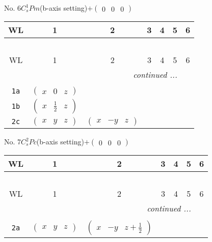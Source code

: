 \documentclass[fleqn,9pt,landscape]{jsarticle}
\begin{document}
\newpage
No. 6\quad$C_{s}^{1}$\quad$Pm$\quad(b-axis setting)\quad[ monoclinic ]\quad$+\begin{pmatrix} 0 & 0 & 0 \end{pmatrix}$
\begin{center}
\renewcommand{\arraystretch}{1.2}
\begin{longtable}{ccccccc}
 \hline \hline
WL & 1 & 2 & 3 & 4 & 5 & 6 \\ \hline \endfirsthead

\multicolumn{6}{l}{\tablename\ \thetable{}} \\
 \hline \hline
WL & 1 & 2 & 3 & 4 & 5 & 6 \\ \hline \endhead

 \hline \hline
\multicolumn{6}{r}{\footnotesize\it continued ...} \\ \endfoot

 \hline \hline
\multicolumn{6}{r}{} \\ \endlastfoot

{\tt 1a} & $ \begin{pmatrix} x & 0 & z \end{pmatrix} $ & $  $ \\ \hline
{\tt 1b} & $ \begin{pmatrix} x & \frac{1}{2} & z \end{pmatrix} $ & $  $ \\ \hline
{\tt 2c} & $ \begin{pmatrix} x & y & z \end{pmatrix} $ & $ \begin{pmatrix} x & - y & z \end{pmatrix} $ \\
\end{longtable}
\end{center}
\newpage
No. 7\quad$C_{s}^{2}$\quad$Pc$\quad(b-axis setting)\quad[ monoclinic ]\quad$+\begin{pmatrix} 0 & 0 & 0 \end{pmatrix}$
\begin{center}
\renewcommand{\arraystretch}{1.2}
\begin{longtable}{ccccccc}
 \hline \hline
WL & 1 & 2 & 3 & 4 & 5 & 6 \\ \hline \endfirsthead

\multicolumn{6}{l}{\tablename\ \thetable{}} \\
 \hline \hline
WL & 1 & 2 & 3 & 4 & 5 & 6 \\ \hline \endhead

 \hline \hline
\multicolumn{6}{r}{\footnotesize\it continued ...} \\ \endfoot

 \hline \hline
\multicolumn{6}{r}{} \\ \endlastfoot

{\tt 2a} & $ \begin{pmatrix} x & y & z \end{pmatrix} $ & $ \begin{pmatrix} x & - y & z + \frac{1}{2} \end{pmatrix} $ \\
\end{longtable}
\end{center}
\end{document}
